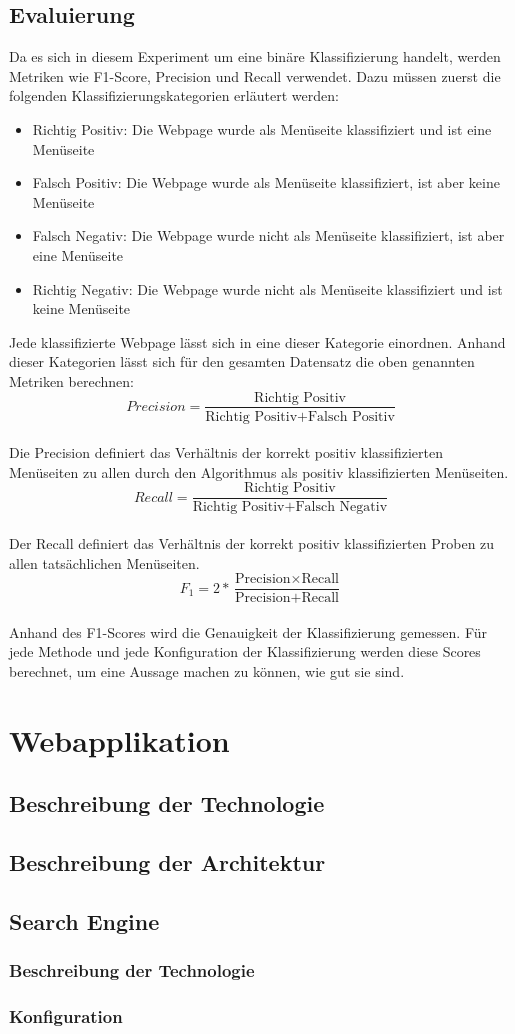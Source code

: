 \subsection{Evaluierung}
Da es sich in diesem Experiment um eine binäre Klassifizierung handelt, werden Metriken wie F1-Score, Precision und Recall verwendet.
Dazu müssen zuerst die folgenden Klassifizierungskategorien erläutert werden:
\begin{itemize}
	\item Richtig Positiv: Die Webpage wurde als Menüseite klassifiziert und ist eine Menüseite
	\item Falsch Positiv: Die Webpage wurde als Menüseite klassifiziert, ist aber keine Menüseite
	\item Falsch Negativ: Die Webpage wurde nicht als Menüseite klassifiziert, ist aber eine Menüseite
	\item Richtig Negativ: Die Webpage wurde nicht als Menüseite klassifiziert und ist keine Menüseite
\end{itemize}
Jede klassifizierte Webpage lässt sich in eine dieser Kategorie einordnen.
Anhand dieser Kategorien lässt sich für den gesamten Datensatz die oben genannten Metriken berechnen:\\
\[Precision=\frac{\text{Richtig Positiv}}{\text{Richtig Positiv} + \text{Falsch Positiv}}\]\\
Die Precision definiert das Verhältnis der korrekt positiv klassifizierten Menüseiten zu allen durch den Algorithmus als positiv klassifizierten Menüseiten.\\
\[Recall=\frac{\text{Richtig Positiv}}{\text{Richtig Positiv} + \text{Falsch Negativ}}\]\\
Der Recall definiert das Verhältnis der korrekt positiv klassifizierten Proben zu allen tatsächlichen Menüseiten.\\
\[F_{1}=2*\frac{\text{Precision} \times \text{Recall}}{\text{Precision} + \text{Recall}}\]\\
Anhand des F1-Scores wird die Genauigkeit der Klassifizierung gemessen.
Für jede Methode und jede Konfiguration der Klassifizierung werden diese Scores berechnet, um eine Aussage machen zu können, wie gut sie sind.
\section{Webapplikation}
\subsection{Beschreibung der Technologie}
\subsection{Beschreibung der Architektur}
\subsection{Search Engine}
\subsubsection{Beschreibung der Technologie}
\subsubsection{Konfiguration}
